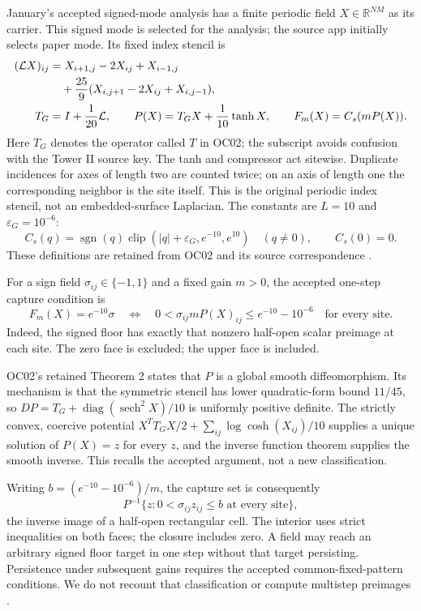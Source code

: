 \documentclass[11pt,a4paper]{article}
\theoremstyle{remark}\newtheorem{remark}[theorem]{Remark}
\DeclareMathOperator{\sgn}{sgn}
\DeclareMathOperator{\clip}{clip}
\newcommand{\R}{\mathbb R}
\numberwithin{equation}{section}
\begin{document}
January's accepted signed-mode analysis has a finite periodic field
$X\in\R^{NM}$ as its carrier. This signed mode is selected for the analysis;
the source app initially selects paper mode. Its fixed index stencil is
\begin{align}
(\mathcal LX)_{ij}
&=X_{i+1,j}-2X_{ij}+X_{i-1,j}\notag\\
&\quad+\frac{25}{9}(X_{i,j+1}-2X_{ij}+X_{i,j-1}),\label{eq:grid-stencil}\\
T_G&=I+\frac1{20}\mathcal L,\qquad
P(X)=T_GX+\frac1{10}\tanh X,\qquad F_m(X)=C_s(mP(X)).
\label{eq:grid-P}
\end{align}
Here $T_G$ denotes the operator called $T$ in OC02; the subscript avoids
confusion with the Tower II source key. The tanh and compressor act sitewise.
Duplicate incidences for axes of length two are counted twice; on an axis
of length one the corresponding neighbor is the site itself. This is the
original periodic index stencil, not an embedded-surface Laplacian.
The constants are $L=10$ and $\varepsilon_G=10^{-6}$:
\[
C_s(q)=\sgn(q)\clip(|q|+\varepsilon_G,e^{-10},e^{10})
\quad(q\ne0),\qquad C_s(0)=0.
\]
These definitions are retained from OC02 \cite[equations (1)--(2)]{G}
and its source correspondence \cite{January}.

For a sign field $\sigma_{ij}\in\{-1,1\}$ and a fixed gain $m>0$, the
accepted one-step capture condition is
\begin{equation}
F_m(X)=e^{-10}\sigma
\quad\Longleftrightarrow\quad
0<\sigma_{ij}mP(X)_{ij}\le e^{-10}-10^{-6}
\quad\text{for every site}.\label{eq:grid-capture}
\end{equation}
Indeed, the signed floor has exactly that nonzero half-open scalar
preimage at each site. The zero face is excluded; the upper face is included.

OC02's retained Theorem 2 states that $P$ is a global smooth diffeomorphism.
Its mechanism is that the symmetric stencil has lower quadratic-form bound
$11/45$, so $DP=T_G+\operatorname{diag}(\operatorname{sech}^2X)/10$ is
uniformly positive definite. The strictly convex, coercive potential
$X^TT_GX/2+\sum_{ij}\log\cosh(X_{ij})/10$ supplies a unique solution of
$P(X)=z$ for every $z$, and the inverse function theorem supplies the smooth
inverse. This recalls the accepted argument, not a new classification.

Writing $b=(e^{-10}-10^{-6})/m$, the capture set is consequently
\[
P^{-1}\{z:0<\sigma_{ij}z_{ij}\le b\text{ at every site}\},
\]
the inverse image of a half-open rectangular cell. The interior uses strict
inequalities on both faces; the closure includes zero.
A field may reach an arbitrary signed floor target in one step without that
target persisting. Persistence under subsequent gains requires the accepted
common-fixed-pattern conditions. We do not recount that classification or
compute multistep preimages \cite[lines 224--269]{G}.
\end{document}

